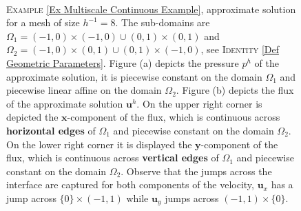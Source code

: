 \documentclass[3p]{elsarticle}
\def\u{\mathbf u}
\begin{document}
\begin{example}
\begin{figure}[h]
\begin{subfigure}
{			{\texttt{[image: Multiscale\_Approx\_Pressure.pdf]} } 
			}
	\end{subfigure} %
	~ %
	\begin{subfigure}[Flux Approximate Solution.]
		{\resizebox{7.8cm}{8.0cm}
			{\texttt{[image: Multiscale\_Approx\_Velocity.pdf]} } 
			}                
	\end{subfigure} %
	\caption{\textsc{Example} \ref{Ex Multiscale Continuous Example}, approximate solution for a mesh of size $ h^{-1} = 8 $. The sub-domains are $\Omega_{1} = (-1, 0) \times (-1, 0)\cup  (0, 1) \times  (0, 1)$ and $\Omega_2 =  (-1, 0) \times (0, 1)\cup  (0, 1) \times  (-1, 0)$, see \textsc{Identity} \eqref{Def Geometric Parameters}.  Figure (a) depicts the pressure $p^{h}$ of the approximate solution, it is piecewise constant on the domain $\Omega_{1} $ and piecewise linear affine on the domain $\Omega_2$.
	Figure (b) depicts the flux of the approximate solution $\u^{h}$. On the upper right corner is depicted the $\boldsymbol{x}$-component of the flux, which is continuous across \textbf{horizontal edges} of $\Omega_{1}$ and piecewise constant on the domain $\Omega_2$.	
	On the lower right corner it is displayed
	the $\boldsymbol{y}$-component of the flux, which is continuous across \textbf{vertical edges} of $\Omega_{1}$ and piecewise constant on the domain $\Omega_2$. Observe that the jumps across the interface are captured for both components of the velocity, $ \u_{x} $ has a jump across $ \{0\} \times(-1, 1) $ while $ \u_{y} $ jumps across $ (-1, 1) \times \{0\} $. \label{Fig Multiscale Cont Approximate Solution Numerical Example} }
\end{figure}

\end{example}
\end{document}
